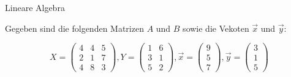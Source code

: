 \documentclass[addpoints,a4paper,ngerman,12pt,answers]{exam}
\begin{document}
\begin{questions}
    \question Lineare Algebra

    Gegeben sind die folgenden Matrizen $A$ und $B$ sowie die Vekoten $\vec{x}$ und $\vec{y}$:

    \begin{equation*}
        X =
        \begin{pmatrix}
        4 & 4 & 5 \\
        2 & 1 & 7 \\
        4 & 8 & 3
        \end{pmatrix}
        ,
        Y =
        \begin{pmatrix}
        1 & 6 \\
        3 & 1 \\
        5 & 2
        \end{pmatrix}
        ,
        \vec{x} =
        \begin{pmatrix}
        9 \\
        5 \\
        7
        \end{pmatrix}
        ,
        \vec{y} =
        \begin{pmatrix}
        3 \\
        1 \\
        5
        \end{pmatrix}
    \end{equation*}

    \vspace{0.3cm}

\end{questions}
\end{document}
